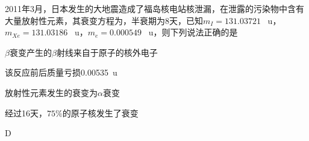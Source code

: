 2011年3月，日本发生的大地震造成了福岛核电站核泄漏，在泄露的污染物中含有大量放射性元素，其衰变方程为，半衰期为8天，已知\(m_{I}=131.03721\) \qty{}{u}，\(m_{Xe}=131.03186\) \qty{}{u}，\(m_e=0.000549\) \qty{}{u}，则下列说法正确的是\paren[]
\begin{choices}
	\item \(\beta\)衰变产生的\(\beta\)射线来自于原子的核外电子
	\item 该反应前后质量亏损\qty{0.00535}{u}
	\item 放射性元素发生的衰变为\(\alpha\)衰变
	\item 经过16天，\(75\%\)的原子核发生了衰变
\end{choices}  
\begin{answer}
	D
\end{answer}